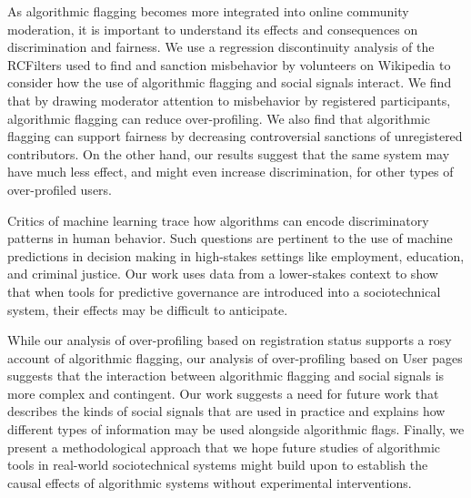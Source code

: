 \documentclass[format=acmsmall, natbib=true,  screen=true]{acmart}
\begin{document}
As algorithmic flagging becomes more integrated into online community moderation, it is important to understand its effects and consequences on discrimination and fairness. 
We use a regression discontinuity analysis of the RCFilters used to find and sanction misbehavior by volunteers on Wikipedia to consider how the use of algorithmic flagging and social signals interact.
We find that by drawing moderator attention to misbehavior by registered participants, algorithmic flagging can reduce over-profiling.
We also find that algorithmic flagging can support fairness by decreasing controversial sanctions of unregistered contributors.   
On the other hand, our results suggest that the same system may have much less effect, and might even increase discrimination, for other types of over-profiled users.

Critics of machine learning trace how algorithms can encode discriminatory patterns in human behavior.  Such questions are pertinent to the use of machine predictions in decision making in high-stakes settings like employment, education, and criminal justice. Our work uses data from a lower-stakes context to show that when tools for predictive governance are introduced into a sociotechnical system, their effects may be difficult to anticipate.  

While our analysis of over-profiling based on registration status supports a rosy account of algorithmic flagging, our analysis of over-profiling based on User pages
suggests that the interaction between algorithmic flagging and social signals is more complex and contingent. 
Our work suggests a need for future work that describes the kinds of social signals that are used in practice and explains how different types of information may be used alongside algorithmic flags. Finally, we present a methodological approach that we hope future studies of algorithmic tools in real-world sociotechnical systems might build upon to establish the causal effects of algorithmic systems without experimental interventions.



\end{document}
